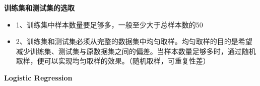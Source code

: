 \documentclass[10pt,a4paper]{ctexbook}
\begin{document}
\textbf{训练集和测试集的选取}
\begin{itemize}
\item 1、训练集中样本数量要足够多，一般至少大于总样本数的50%
\item 2、训练集和测试集必须从完整的数据集中均匀取样。均匀取样的目的是希望减少训练集、测试集与原数据集之间的偏差。当样本数量足够多时，通过随机取样，便可以实现均匀取样的效果。（随机取样，可重复性差）
\end{itemize}

\textbf{Logistic Regression}

\ifx\mlbook\undefined
    
\end{document}
